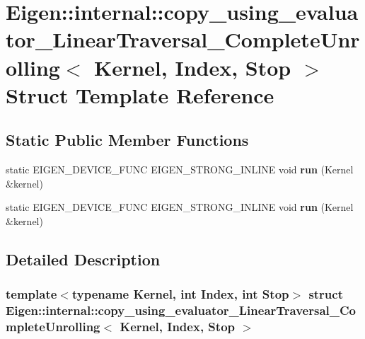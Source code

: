 \hypertarget{struct_eigen_1_1internal_1_1copy__using__evaluator___linear_traversal___complete_unrolling}{}\section{Eigen\+:\+:internal\+:\+:copy\+\_\+using\+\_\+evaluator\+\_\+\+Linear\+Traversal\+\_\+\+Complete\+Unrolling$<$ Kernel, Index, Stop $>$ Struct Template Reference}
\label{struct_eigen_1_1internal_1_1copy__using__evaluator___linear_traversal___complete_unrolling}
\subsection*{Static Public Member Functions}
\begin{DoxyCompactItemize}
\item 
\mbox{\label{struct_eigen_1_1internal_1_1copy__using__evaluator___linear_traversal___complete_unrolling_a290a74d6dfcf33ce64f78513f29574e9}} 
static E\+I\+G\+E\+N\+\_\+\+D\+E\+V\+I\+C\+E\+\_\+\+F\+U\+NC E\+I\+G\+E\+N\+\_\+\+S\+T\+R\+O\+N\+G\+\_\+\+I\+N\+L\+I\+NE void {\bfseries run} (Kernel \&kernel)
\item 
\mbox{\label{struct_eigen_1_1internal_1_1copy__using__evaluator___linear_traversal___complete_unrolling_a290a74d6dfcf33ce64f78513f29574e9}} 
static E\+I\+G\+E\+N\+\_\+\+D\+E\+V\+I\+C\+E\+\_\+\+F\+U\+NC E\+I\+G\+E\+N\+\_\+\+S\+T\+R\+O\+N\+G\+\_\+\+I\+N\+L\+I\+NE void {\bfseries run} (Kernel \&kernel)
\end{DoxyCompactItemize}


\subsection{Detailed Description}
\subsubsection*{template$<$typename Kernel, int Index, int Stop$>$\newline
struct Eigen\+::internal\+::copy\+\_\+using\+\_\+evaluator\+\_\+\+Linear\+Traversal\+\_\+\+Complete\+Unrolling$<$ Kernel, Index, Stop $>$}



